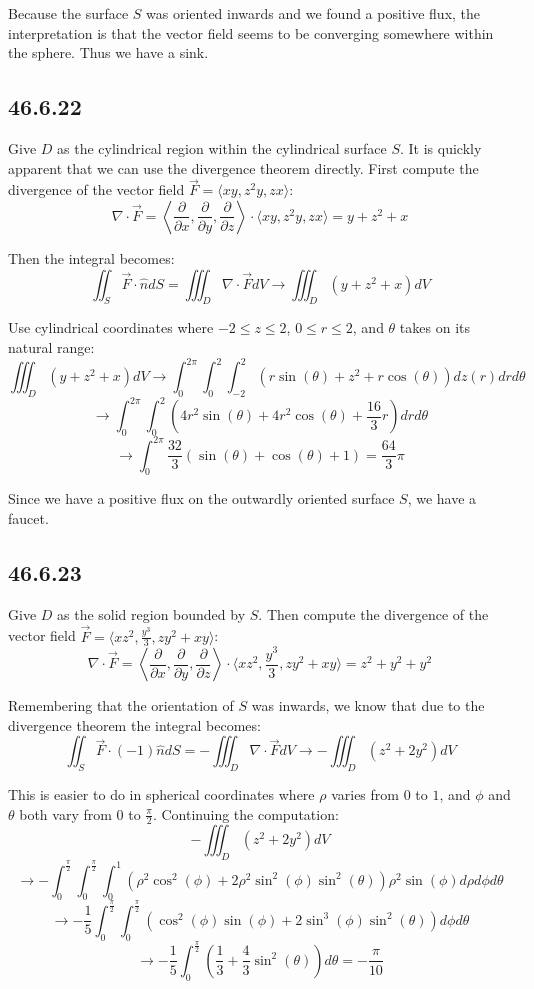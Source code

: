 \documentclass{article}
\begin{document}
Because the surface $S$ was oriented inwards and we found a positive flux, the interpretation is that the vector field seems to be converging somewhere within the sphere. Thus we have a sink.

\subsection{46.6.22}

Give $D$ as the cylindrical region within the cylindrical surface $S$. It is quickly apparent that we can use the divergence theorem directly. First compute the divergence of the vector field $\vec{F} = \langle xy,z^2y,zx\rangle$:
$$\nabla \cdot \vec{F} = \left\langle \frac{\partial}{\partial x}, \frac{\partial}{\partial y} ,\frac{\partial}{\partial z} \right\rangle \cdot  \langle xy,z^2y,zx\rangle  = y+z^2+x$$

Then the integral becomes:
$$\iint_S \vec{F}\cdot \hat{n}dS = \iiint_D \nabla \cdot \vec{F}dV \to \iiint_D (y+z^2+x)dV$$

Use cylindrical coordinates where $-2\leq z \leq 2$, $0\leq r \leq 2$, and $\theta$ takes on its natural range:
$$\iiint_D (y+z^2+x)dV \to \int_0^{2\pi}\int_0^2\int_{-2}^2 (r\sin(\theta)+z^2+r\cos(\theta))dz(r)drd\theta$$
$$\to \int_0^{2\pi}\int_0^2 \left(4r^2\sin(\theta)+4r^2\cos(\theta)+\frac{16}{3}r\right)drd\theta$$
$$\to \int_0^{2\pi} \frac{32}{3}(\sin(\theta)+\cos(\theta)+1) = \frac{64}{3}\pi$$

Since we have a positive flux on the outwardly oriented surface $S$, we have a faucet.

\subsection{46.6.23}

Give $D$ as the solid region bounded by $S$. Then compute the divergence of the vector field $\vec{F} = \langle xz^2,\frac{y^3}{3},zy^2+xy\rangle$:
$$\nabla \cdot \vec{F} = \left\langle \frac{\partial}{\partial x}, \frac{\partial}{\partial y} ,\frac{\partial}{\partial z} \right\rangle \cdot  \langle xz^2,\frac{y^3}{3},zy^2+xy\rangle  = z^2+y^2+y^2$$

Remembering that the orientation of $S$ was inwards, we know that due to the divergence theorem the integral becomes:
$$\iint_S \vec{F}\cdot (-1)\hat{n}dS = -\iiint_D \nabla \cdot \vec{F}dV \to -\iiint_D (z^2+2y^2)dV$$

This is easier to do in spherical coordinates where $\rho$ varies from $0$ to $1$, and $\phi$ and $\theta$ both vary from $0$ to $\frac{\pi}{2}$. Continuing the computation:
$$-\iiint_D (z^2+2y^2)dV$$
$$ \to -\int_0^{\frac{\pi}{2}}\int_0^{\frac{\pi}{2}}\int_0^1 (\rho^2\cos^2(\phi)+2\rho^2\sin^2(\phi)\sin^2(\theta))\rho^2\sin(\phi)d\rho d\phi d\theta$$
$$\to -\frac{1}{5}\int_0^{\frac{\pi}{2}}\int_0^{\frac{\pi}{2}} \left(\cos^2(\phi)\sin(\phi)+2\sin^3(\phi)\sin^2(\theta)\right)d\phi d\theta$$
$$\to -\frac{1}{5}\int_0^{\frac{\pi}{2}} \left(\frac{1}{3}+\frac{4}{3}\sin^2(\theta)\right)d\theta = -\frac{\pi}{10}$$
\end{document}
